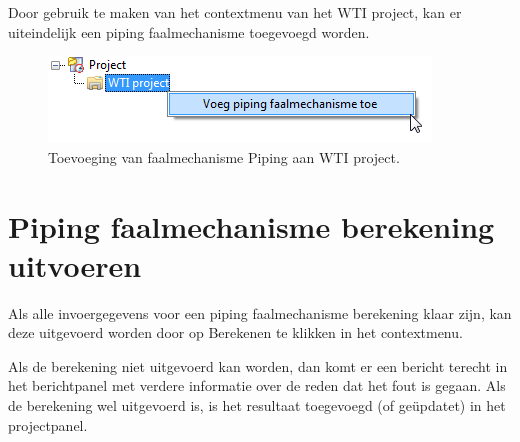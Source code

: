 Door gebruik te maken van het contextmenu van het WTI project, kan er uiteindelijk een piping faalmechanisme toegevoegd worden.

\begin{figure} [H]
	\centering
		\includegraphics{figures/chapter_piping/addPipingMechanismToProject}
	\caption{Toevoeging van faalmechanisme Piping aan WTI project.}
	\label{fig:fig5.3}
\end{figure}


\section{Piping faalmechanisme berekening uitvoeren}
Als alle invoergegevens voor een piping faalmechanisme berekening klaar zijn, kan deze uitgevoerd worden door op Berekenen te klikken in het contextmenu.

Als de berekening niet uitgevoerd kan worden, dan komt er een bericht terecht in het berichtpanel met verdere informatie over de reden dat het fout is gegaan. Als de berekening wel uitgevoerd is, is het resultaat toegevoegd (of ge\"{u}pdatet) in het projectpanel.





